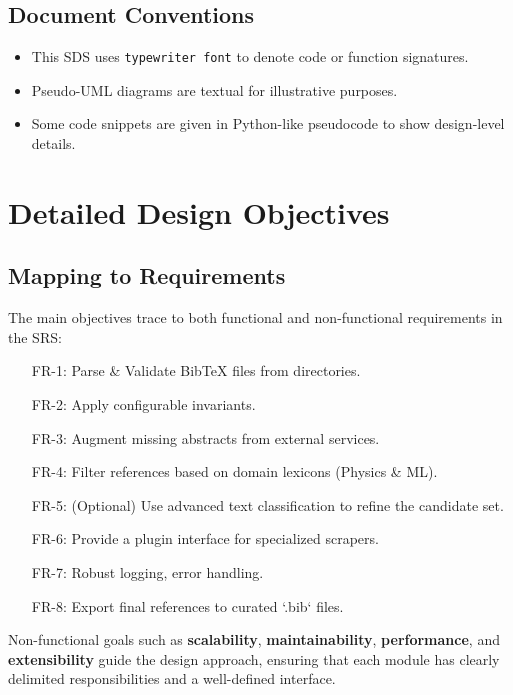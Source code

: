 \documentclass[12pt]{article}
\begin{document}
\subsection{Document Conventions}
\begin{itemize}
  \item This SDS uses \texttt{typewriter font} to denote code or function signatures.
  \item Pseudo-UML diagrams are textual for illustrative purposes.
  \item Some code snippets are given in Python-like pseudocode to show design-level details.
\end{itemize}

\section{Detailed Design Objectives}

\subsection{Mapping to Requirements}
The main objectives trace to both functional and non-functional requirements in the SRS:

\begin{itemize}[leftmargin=2cm]
\item[FR-1:] Parse \& Validate BibTeX files from directories.
\item[FR-2:] Apply configurable invariants.
\item[FR-3:] Augment missing abstracts from external services.
\item[FR-4:] Filter references based on domain lexicons (Physics \& ML).
\item[FR-5:] (Optional) Use advanced text classification to refine the candidate set.
\item[FR-6:] Provide a plugin interface for specialized scrapers.
\item[FR-7:] Robust logging, error handling.
\item[FR-8:] Export final references to curated `.bib` files.
\end{itemize}

Non-functional goals such as \textbf{scalability}, \textbf{maintainability}, \textbf{performance}, and \textbf{extensibility} guide the design approach, ensuring that each module has clearly delimited responsibilities and a well-defined interface.
\end{document}
